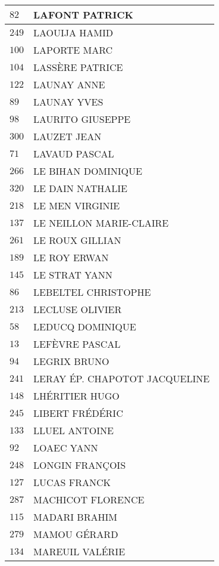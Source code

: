 \begin{xltabular}{\linewidth}{|l|X|}
    \hline
    $82$ & LAFONT PATRICK \\
    \hline
    $249$ & LAOUIJA HAMID \\
    \hline
    $100$ & LAPORTE MARC \\
    \hline
    $104$ & LASSÈRE PATRICE \\
    \hline
    $122$ & LAUNAY ANNE \\
    \hline
    $89$ & LAUNAY YVES \\
    \hline
    $98$ & LAURITO GIUSEPPE \\
    \hline
    $300$ & LAUZET JEAN \\
    \hline
    $71$ & LAVAUD PASCAL \\
    \hline
    $266$ & LE BIHAN DOMINIQUE \\
    \hline
    $320$ & LE DAIN NATHALIE \\
    \hline
    $218$ & LE MEN VIRGINIE \\
    \hline
    $137$ & LE NEILLON MARIE-CLAIRE \\
    \hline
    $261$ & LE ROUX GILLIAN \\
    \hline
    $189$ & LE ROY ERWAN \\
    \hline
    $145$ & LE STRAT YANN \\
    \hline
    $86$ & LEBELTEL CHRISTOPHE \\
    \hline
    $213$ & LECLUSE OLIVIER \\
    \hline
    $58$ & LEDUCQ DOMINIQUE \\
    \hline
    $13$ & LEFÈVRE PASCAL \\
    \hline
    $94$ & LEGRIX BRUNO \\
    \hline
    $241$ & LERAY ÉP. CHAPOTOT JACQUELINE \\
    \hline
    $148$ & LHÉRITIER HUGO \\
    \hline
    $245$ & LIBERT FRÉDÉRIC \\
    \hline
    $133$ & LLUEL ANTOINE \\
    \hline
    $92$ & LOAEC YANN \\
    \hline
    $248$ & LONGIN FRANÇOIS \\
    \hline
    $127$ & LUCAS FRANCK \\
    \hline
    $287$ & MACHICOT FLORENCE \\
    \hline
    $115$ & MADARI BRAHIM \\
    \hline
    $279$ & MAMOU GÉRARD \\
    \hline
    $134$ & MAREUIL VALÉRIE \\

\end{xltabular}
